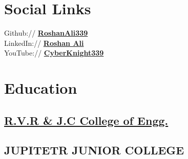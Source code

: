 \documentclass[]{roshan_resume}
\begin{document}
	
	
	
	
	\begin{minipage}[t]{0.33\textwidth} 
		
		
		\section{Social Links} 
		Github:// \href{https://github.com/RoshanAli339}{\bf RoshanAli339} \\
		LinkedIn://  \href{https://www.linkedin.com/in/roshan-ali-shaik-011714222/}{\bf Roshan Ali} \\
		YouTube://  \href{https://www.youtube.com/@cyberknight339}{\bf CyberKnight339} \\
		
		
		
		\section{Education} 
		
		\subsection{\href{https://rvrjcce.ac.in/}{R.V.R \& J.C College of Engg.}}
		\sectionsep
		
		\subsection{JUPITETR JUNIOR COLLEGE}
		\sectionsep
		

\end{minipage}
\end{document}
